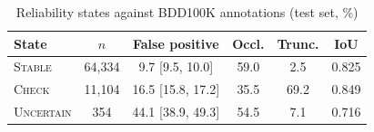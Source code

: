 \begin{table}[t]
\centering
\caption{Reliability states against BDD100K annotations (test set, \%)}
\label{tab:states_test}
\footnotesize
\setlength{\tabcolsep}{3pt}
\begin{tabular}{lccccc}
\hline
State & $n$ & False positive & Occl. & Trunc. & IoU \\
\hline
\textsc{Stable} & 64{,}334 & 9.7 [9.5, 10.0] & 59.0 & 2.5 & 0.825 \\
\textsc{Check} & 11{,}104 & 16.5 [15.8, 17.2] & 35.5 & 69.2 & 0.849 \\
\textsc{Uncertain} & 354 & 44.1 [38.9, 49.3] & 54.5 & 7.1 & 0.716 \\
\hline
\end{tabular}
\end{table}
